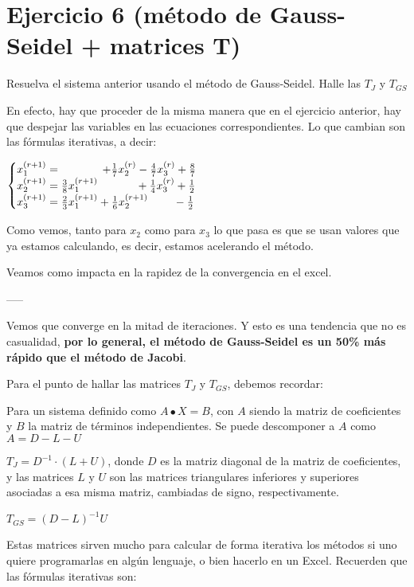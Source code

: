 \documentclass[11pt]{article}
\begin{document}
	\section{Ejercicio 6 (método de Gauss-Seidel + matrices T)}
	Resuelva el sistema anterior usando el método de Gauss-Seidel. Halle las $T_J$ y $T_{GS}$
	
	En efecto, hay que proceder de la misma manera que en el ejercicio anterior, hay que despejar las variables en las ecuaciones correspondientes. Lo que cambian son las fórmulas iterativas, a decir:
	
	$\displaystyle \begin{cases}
		x_1^{(r+1)}=\hspace{1.3cm}+\frac{1}{7}x_2^{(r)}-\frac{4}{7}x_3^{(r)}+\frac{8}{7}\\
		x_2^{(r+1)}=\frac{3}{8}x_1^{(r+1)} \hspace{1.2cm}+\frac{1}{4}x_3^{(r)}+\frac{1}{2}\\
		x_3^{(r+1)}=\frac{2}{3}x_1^{(r+1)}+\frac{1}{6}x_2^{(r+1)} \hspace{0.8cm}-\frac{1}{2}
	\end{cases}$

	Como vemos, tanto para $x_2$ como para $x_3$ lo que pasa es que se usan valores que ya estamos calculando, es decir, estamos acelerando el método.
	
	Veamos como impacta en la rapidez de la convergencia en el excel.
	
	-----
	
	Vemos que converge en la mitad de iteraciones. Y esto es una tendencia que no es casualidad, \textbf{por lo general, el método de Gauss-Seidel es un 50\% más rápido que el método de Jacobi}.
	
	Para el punto de hallar las matrices $T_J$ y $T_{GS}$, debemos recordar:
	
	Para un sistema definido como $A \bullet X = B$, con $A$ siendo la matriz de coeficientes y $B$ la matriz de términos independientes. Se puede descomponer a $A$ como $A=D-L-U$
	
	$T_J=D^{-1}\cdot (L+U)$, donde $D$ es la matriz diagonal de la matriz de coeficientes, y las matrices $L$ y $U$ son las matrices triangulares inferiores y superiores asociadas a esa misma matriz, cambiadas de signo, respectivamente.
	
	$T_{GS}=(D-L)^{-1}U$
	
	Estas matrices sirven mucho para calcular de forma iterativa los métodos si uno quiere programarlas en algún lenguaje, o bien hacerlo en un Excel. Recuerden que las fórmulas iterativas son:
	
\end{document}
